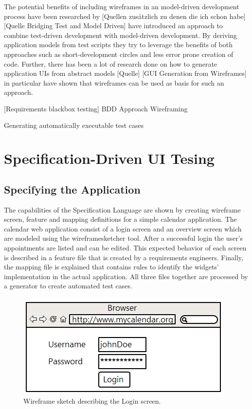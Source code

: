 \documentclass{sig-alternate-05-2015}
\begin{document}


The potential benefits of including wireframes in an model-driven development process have been researched by [Quellen zusätzlich zu denen die ich schon habe]
[Quelle Bridging Test and Model Driven] have introduced an approach to combine test-driven development with model-driven development.
By deriving application models from test scripts they try to leverage the benefits of both approaches such as short-development circles and less error prone creation of code.
Further, there has been a lot of research done on how to generate application UIs from abstract models [Quelle]
[GUI Generation from Wireframes] in particular have shown that wireframes can be used as basis for such an approach.



[Requirements blackbox testing] 
BDD Approach
Wireframing

Generating automatically executable test cases


\section{Specification-Driven UI Tesing}\label{sec:SpecificationDrivenUITesting}
\subsection{Specifying the Application}\label{sec:SpecifyingTheApplication} 
The capabilities of the Specification Language are shown by creating wireframe screen, feature and mapping definitions for a simple calendar application.
The calendar web application consist of a login screen and an overview screen which are modeled using the wireframesketcher tool.
After a successful login the user's appointments are listed and can be edited.
This expected behavior of each screen is described in a feature file that is created by a requirements engineers.
Finally, the mapping file is explained that contains rules to identify the widgets' implementation in the actual application.
All three files together are processed by a generator to create automated test cases.

\begin{figure}[h]
	\centering
	\includegraphics[width=0.8\linewidth]{Login.png}
	\caption{Wireframe sketch describing the Login screen.}
	\label{fig:login}
\end{figure}
\end{document}
